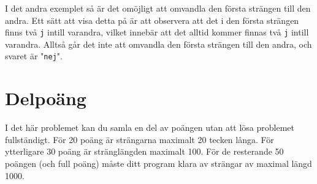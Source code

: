 I det andra exemplet så är det omöjligt att omvandla den första strängen till den andra. Ett sätt att visa detta på är att observera att det i den första strängen finns två \texttt{j} intill varandra, vilket innebär att det alltid kommer finnas två \texttt{j} intill varandra. Alltså går det inte att omvandla den första strängen till den andra, och svaret är "\texttt{nej}".

\section*{Delpoäng}
I det här problemet kan du samla en del av poängen utan att lösa problemet fullständigt. För 20 poäng är strängarna maximalt 20 tecken långa. För ytterligare 30 poäng är stränglängden maximalt 100. För de resterande 50 poängen (och full poäng) måste ditt program klara av strängar av maximal längd 1000.
